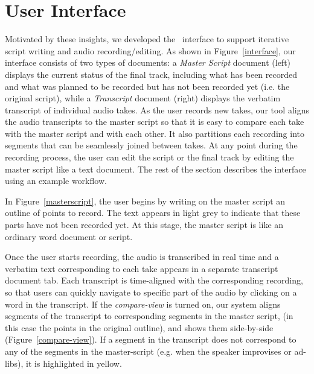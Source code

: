 \section{User Interface}
Motivated by these insights, we developed the \systemname\  interface to support iterative script writing and  audio recording/editing. As shown in Figure~\ref{interface}, our interface consists of two types of documents: a \textit{Master Script} document (left) displays the current status of the final track, including what has been recorded and what was planned to be recorded but has not been recorded yet (i.e. the original script), while a \textit{Transcript} document (right) displays the verbatim transcript of individual audio takes. As the user records new takes, our tool aligns the audio transcripts to the master script so that it is easy to compare each take with the master script and with each other. It also partitions each recording into segments that can be seamlessly joined between takes. At any point during the recording process, the user can edit the script or the final track by editing the master script like a text document. The rest of the section describes the interface using an example workflow. 

In Figure~\ref{masterscript}, the user begins by writing on the master script an outline  of points to record. The text appears in light grey to indicate that these parts have not been recorded yet. At this stage, the master script is like an ordinary
word document or script. 

Once the user starts recording, the audio is transcribed in real time and a verbatim text corresponding to each take appears in a separate transcript document tab. Each transcript is time-aligned with the corresponding recording, so that users can quickly navigate to specific
part of the audio by clicking on a word in the transcript. If the \textit{compare-view} is turned on, our system aligns segments of the transcript to corresponding segments in the master script, (in this case the points in the original outline), and shows them side-by-side (Figure~\ref{compare-view}). If a segment in the transcript does not correspond to any of the segments in the master-script (e.g. when the speaker improvises or ad-libs), it is highlighted in yellow.



